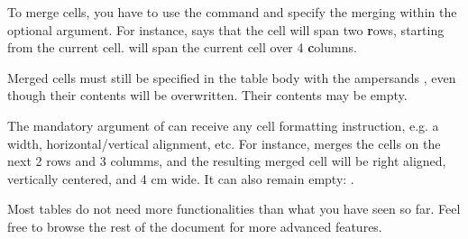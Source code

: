To merge cells, you have to use the command  and specify the merging within the optional argument. For instance,  says that the cell will span two \textbf{r}ows, starting from the current cell.  will span the current cell over 4 \textbf{c}olumns.

Merged cells must still be specified in the table body with the ampersands \snippet{\&}, even though their contents will be overwritten. Their contents may be empty.

The mandatory argument of  can receive any cell formatting instruction, e.g. a width, horizontal/vertical alignment, etc. For instance,  merges the cells on the next 2 rows and 3 columms, and the resulting merged cell will be right aligned, vertically centered, and 4 cm wide. It can also remain empty: .


\vfill

\begin{infobox}{}
	Most tables do not need more functionalities than what you have seen so far. Feel free to browse the rest of the document for more advanced features.
\end{infobox}

\vfill